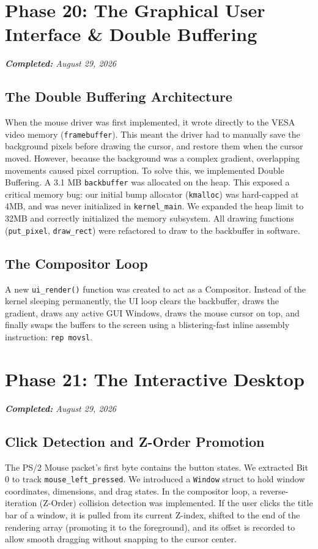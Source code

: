 \documentclass[12pt,a4paper]{report}
\begin{document}
\newpage

\section{Phase 20: The Graphical User Interface \& Double Buffering}
{\small\textit{\textbf{Completed:} August 29, 2026}}\par\medskip
\subsection{The Double Buffering Architecture}
When the mouse driver was first implemented, it wrote directly to the VESA video memory (\texttt{framebuffer}). This meant the driver had to manually save the background pixels before drawing the cursor, and restore them when the cursor moved. However, because the background was a complex gradient, overlapping movements caused pixel corruption.
To solve this, we implemented Double Buffering. A 3.1 MB \texttt{backbuffer} was allocated on the heap. This exposed a critical memory bug: our initial bump allocator (\texttt{kmalloc}) was hard-capped at 4MB, and was never initialized in \texttt{kernel\_main}. We expanded the heap limit to 32MB and correctly initialized the memory subsystem. 
All drawing functions (\texttt{put\_pixel}, \texttt{draw\_rect}) were refactored to draw to the backbuffer in software.

\subsection{The Compositor Loop}
A new \texttt{ui\_render()} function was created to act as a Compositor. Instead of the kernel sleeping permanently, the UI loop clears the backbuffer, draws the gradient, draws any active GUI Windows, draws the mouse cursor on top, and finally swaps the buffers to the screen using a blistering-fast inline assembly instruction: \texttt{rep movsl}.

\section{Phase 21: The Interactive Desktop}
{\small\textit{\textbf{Completed:} August 29, 2026}}\par\medskip
\subsection{Click Detection and Z-Order Promotion}
The PS/2 Mouse packet's first byte contains the button states. We extracted Bit 0 to track \texttt{mouse\_left\_pressed}. We introduced a \texttt{Window} struct to hold window coordinates, dimensions, and drag states.
In the compositor loop, a reverse-iteration (Z-Order) collision detection was implemented. If the user clicks the title bar of a window, it is pulled from its current Z-index, shifted to the end of the rendering array (promoting it to the foreground), and its offset is recorded to allow smooth dragging without snapping to the cursor center.
\end{document}
